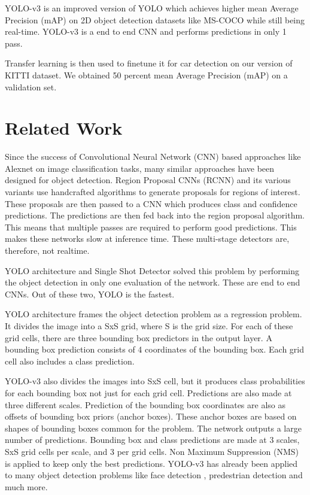\documentclass[10pt,twocolumn,letterpaper]{article}
\begin{document}
YOLO-v3 is an improved version of YOLO \cite{redmon2016yolov1} which achieves 
higher mean Average Precision (mAP) on 2D object detection datasets like MS-COCO \cite{mscoco} while still being real-time. YOLO-v3 is a end to end CNN and performs predictions in only 1 pass.  

Transfer learning is then used to finetune it for car detection on our version of KITTI dataset. We obtained 50 percent mean Average Precision (mAP) on a validation set.
\section{Related Work}
Since the success of Convolutional Neural Network (CNN) based approaches like Alexnet \cite{Alexnet} on image classification tasks, many similar approaches have been designed for object detection. Region Proposal CNNs (RCNN) \cite{ren2015faster} and its various variants use handcrafted algorithms to generate proposals for regions of interest. These proposals are then passed to a CNN which produces class and confidence predictions. The predictions are then fed back into the region proposal algorithm. This means that multiple passes are required to perform good predictions. This makes these networks slow at inference time. These multi-stage detectors are, therefore, not realtime. 

YOLO architecture and Single Shot Detector \cite{SSD_v1} solved this problem by performing the object detection in only one evaluation of the network. These are end to end CNNs. Out of these two, YOLO is the fastest. 

YOLO architecture frames the object detection problem as a regression problem. It divides the image into a SxS grid, where S is the grid size. For each of these grid cells, there are three bounding box predictors in the output layer. A bounding box prediction consists of 4 coordinates of the bounding box. Each grid cell also includes a class prediction. 

YOLO-v3 also divides the images into SxS cell, but it produces class probabilities for each bounding box not just for each grid cell. Predictions are also made at three different scales. Prediction of the bounding box coordinates are also as offsets of bounding box priors (anchor boxes). These anchor boxes are based on shapes of bounding boxes common for the problem. The network outputs a large number of predictions. Bounding box and class predictions are made at 3 scales, SxS grid cells per scale, and 3 per grid cells. Non Maximum Suppression (NMS) is applied to keep only the best predictions. YOLO-v3 has already been applied to many object detection problems like face detection \cite{face_detection_yolo}, predestrian detection \cite{pedestrian_detection} and much more.
\end{document}
